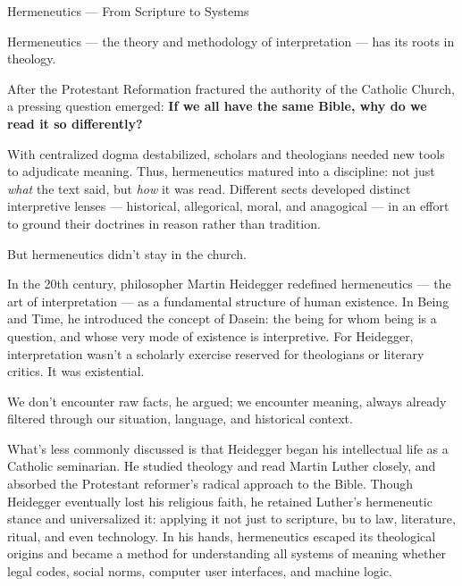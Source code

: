 \begin{PhilosophicalSidebar}{Hermeneutics --- From Scripture to Systems}

    Hermeneutics — the theory and methodology of interpretation — has its roots in theology.
    
    \medskip
    
    After the Protestant Reformation fractured the authority of the Catholic Church, a pressing question emerged:  
    \textbf{If we all have the same Bible, why do we read it so differently?}
    
    \medskip
    
    With centralized dogma destabilized, scholars and theologians needed new tools to adjudicate meaning. Thus, 
    hermeneutics matured into a discipline: not just \textit{what} the text said, but \textit{how} it was read.  
    Different sects developed distinct interpretive lenses — historical, allegorical, moral, and anagogical — 
    in an effort to ground their doctrines in reason rather than tradition.
    
    \medskip
    
    But hermeneutics didn’t stay in the church.
    
    \medskip
    
    In the 20th century, philosopher Martin Heidegger redefined hermeneutics — the art of interpretation — as a 
    fundamental structure of human existence. In Being and Time, he introduced the concept of Dasein: the being for 
    whom being is a question, and whose very mode of existence is interpretive. For Heidegger, interpretation wasn’t 
    a scholarly exercise reserved for theologians or literary critics. It was existential. 

    \medskip
    
    We don’t encounter raw facts, he argued; we encounter meaning, always already filtered through our situation, 
    language, and historical context. 

    \medskip
    
    What’s less commonly discussed is that Heidegger began his intellectual life as 
    a Catholic seminarian. He studied theology and read Martin Luther closely, and absorbed the Protestant reformer’s 
    radical approach to the Bible. Though Heidegger eventually lost his religious faith, he retained Luther’s hermeneutic 
    stance and universalized it: applying it not just to scripture, bu to law, literature, ritual, and even technology. 
    In his hands, hermeneutics escaped its theological origins and became a method for understanding all systems of 
    meaning whether legal codes, social norms, computer user interfaces, and machine logic.
    

\end{PhilosophicalSidebar}
